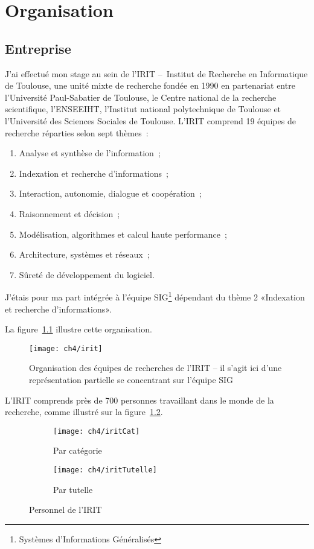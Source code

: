 \cleardoublepage
{}

\chapter{Organisation}


\section{Entreprise}
	J'ai effectué mon stage au sein de l'IRIT --~Institut de Recherche en Informatique de Toulouse, une unité mixte de recherche fondée en 1990 en partenariat entre l'Université Paul-Sabatier de Toulouse, le Centre national de la recherche scientifique, l'ENSEEIHT, l'Institut national polytechnique de Toulouse et l’Université des Sciences Sociales de Toulouse. L'IRIT comprend 19 équipes de recherche réparties selon sept thèmes~:
	\begin{enumerate}
		\item Analyse et synthèse de l’information~;
		\item Indexation et recherche d’informations~;
		\item Interaction, autonomie, dialogue et coopération~;
		\item Raisonnement et décision~;
		\item Modélisation, algorithmes et calcul haute performance~;
		\item Architecture, systèmes et réseaux~;
		\item Sûreté de développement du logiciel.
	\end{enumerate}
	
	J'étais pour ma part intégrée à l'équipe SIG\footnote{Systèmes d’Informations Généralisés} dépendant du thème 2 «Indexation et recherche d’informations».
	
	La figure~\ref{fig:irit} illustre cette organisation.
	
	\begin{figure}[h]
		\centering
		\texttt{[image: ch4/irit]}
		\caption{Organisation des équipes de recherches de l'IRIT -- il s'agit ici d'une représentation partielle se concentrant sur l'équipe SIG}\label{fig:irit}
	\end{figure}
	
	L'IRIT comprends près de 700 personnes travaillant dans le monde de la recherche, comme illustré sur la figure~\ref{fig:iritDiag}.
	
	\begin{figure}[h]
		\centering
		\begin{subfigure}[b]{0.45\textwidth}
			\centering
			\texttt{[image: ch4/iritCat]}
			\caption{Par catégorie}
		\end{subfigure}
		\begin{subfigure}[b]{0.45\textwidth}
			\centering
			\texttt{[image: ch4/iritTutelle]}
			\caption{Par tutelle}
		\end{subfigure}
		\caption{Personnel de l'IRIT}\label{fig:iritDiag}
	\end{figure}


